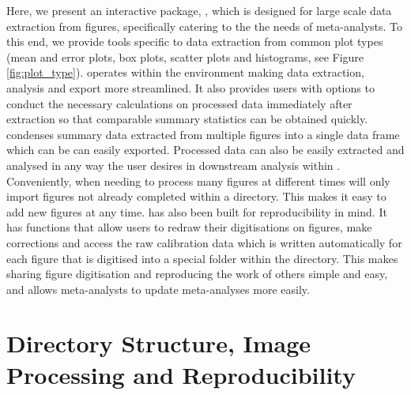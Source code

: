 \documentclass[article]{jss}
\begin{document}
Here, we present an interactive  package, , which is designed for large scale data extraction from figures, specifically catering to the the needs of meta-analysts. To this end, we provide tools specific to data extraction from common plot types (mean and error plots, box plots, scatter plots and histograms, see Figure \ref{fig:plot_type}).  operates within the  environment making data extraction, analysis and export more streamlined. 
It also provides users with options to conduct the necessary calculations on processed data immediately after extraction so that comparable summary statistics can be obtained quickly.  condenses summary data extracted from multiple figures into a single data frame which can be can easily exported. Processed data can also be easily extracted and analysed in any way the user desires in downstream analysis within . Conveniently, when needing to process many figures at different times  will only import figures not already completed within a directory. This makes it easy to add new figures at any time.  has also been built for reproducibility in mind. It has functions that allow users to redraw their digitisations on figures, make corrections and access the raw calibration data which is written automatically for each figure that is digitised into a special folder within the directory. This makes sharing figure digitisation and reproducing the work of others simple and easy, and allows meta-analysts to update meta-analyses more easily.







\section{Directory Structure, Image Processing and Reproducibility}
\end{document}
